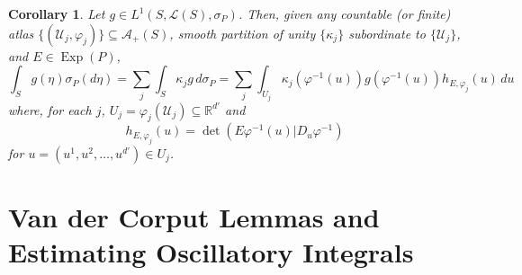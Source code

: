 \documentclass[11pt, letter]{book}
\newtheorem{corollary}[theorem]{Corollary}
\newcommand\Exp{\operatorname{Exp}}
\renewcommand\det{\operatorname{det}}
\begin{document}
\begin{framed}
\begin{corollary}\label{cor:IntegralFormula}
Let $g\in L^1(S,\mathcal{L}(S),\sigma_P)$. Then, given any  countable (or finite) atlas $\{(\mathcal{U}_j,\varphi_j)\}\subseteq\mathcal{A}_+(S)$,  smooth partition of unity $\{\kappa_j\}$ subordinate to $\{\mathcal{U}_j\}$, and $E\in\Exp(P)$,
\begin{equation*}
\int_S g(\eta)\sigma_P(d\eta)=\sum_{j}\int_S \kappa_jg\,d\sigma_P=\sum_j\int_{U_j}\kappa_j(\varphi^{-1}(u))g(\varphi^{-1}(u))h_{E,\varphi_j}(u)\,du
\end{equation*}
where, for each $j$, $U_j=\varphi_j(\mathcal{U}_j)\subseteq\mathbb{R}^{d'}$ and
\begin{equation*}
    h_{E,\varphi_j}(u)=\det(E\varphi^{-1}(u)\vert D_u\varphi^{-1})
\end{equation*}
for $u=(u^1,u^2,\dots,u^{d'})\in U_j$. 
\end{corollary}
\end{framed}















\chapter{Van der Corput Lemmas and Estimating Oscillatory Integrals}\label{chap:VanDerCorput}
\end{document}
